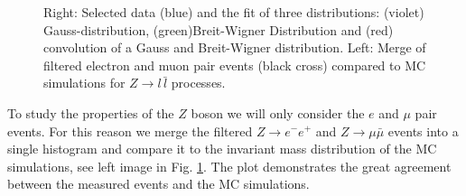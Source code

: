 \documentclass[11 pt]{article}
\begin{document}
\begin{figure}[htbp] 
    \centering
    \begin{subfigure}{0.45\textwidth}
        \centering
    \end{subfigure}
    \hfill
    \begin{subfigure}{0.45\textwidth}
        \centering
    \end{subfigure}
\vspace{1em}
    \caption{\small Right: Selected data (blue) and the fit of three distributions: (violet) Gauss-distribution, (green)Breit-Wigner Distribution and (red) convolution of a Gauss and Breit-Wigner distribution. Left: Merge of filtered electron and muon pair events  (black cross) compared to MC simulations for $Z\to l\,\bar{l}$ processes.}
    \label{fig:results_selected_data}
\end{figure}
To study the properties of the $Z$ boson we will only consider the $e$ and $\mu$ pair events. For this reason we merge the filtered $Z\to e^-e^+$ and $Z\to \mu\bar{\mu}$ events into a single histogram and compare it to the invariant mass distribution of the MC simulations, see left image in Fig. \ref{fig:results_selected_data}. The plot demonstrates the great agreement between the measured events and the MC simulations. 
\end{document}

